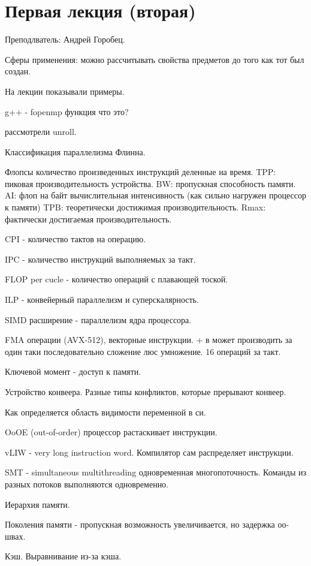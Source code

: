 \documentclass[14pt]{extarticle}
\begin{document}
\section{Первая лекция (вторая)}

Преподлватель: Андрей Горобец.

Сферы применения: можно рассчитывать свойства предметов до того как тот был создан.

На лекции показывали примеры. 

g++ - fopenmp функция что это?

рассмотрели unroll.

Классификация параллелизма Флинна. 

Флопсы количество произведенных инструкций деленные на время. TPP: пиковая производительность устройства. BW: пропускная способность памяти. AI: флоп на байт вычислительная интенсивность (как сильно нагружен процессор к памяти) TPB: теоретически достижимая производительность. Rmax: фактически достигаемая производительность.

CPI - количество тактов на операцию.

IPC - количество инструкций выполняемых за такт.

FLOP per cucle - количество операций с плавающей тоской.

ILP - конвейерный параллелизм и суперскалярность.

SIMD расширение - параллелизм ядра процессора.

FMA операции (AVX-512), векторные инструкции. + в может производить за один таки последовательно сложение люс умножение. 16 операций за такт.

Ключевой момент - доступ к памяти.

Устройство конвеера. Разные типы конфликтов, которые прерывают конвеер.

Как определяется область видимости переменной в си.

OoOE (out-of-order) процессор растаскивает инструкции.

vLIW - very long instruction word. Компилятор сам распределяет инструкции.

SMT - simultaneous multithreading одновременная многопоточность. Команды из разных потоков выполняются одновременно.

Иерархия памяти.

Поколения памяти - пропускная возможность увеличивается, но задержка оо- швах.

Кэш.
Выравнивание из-за кэша.
\end{document}
